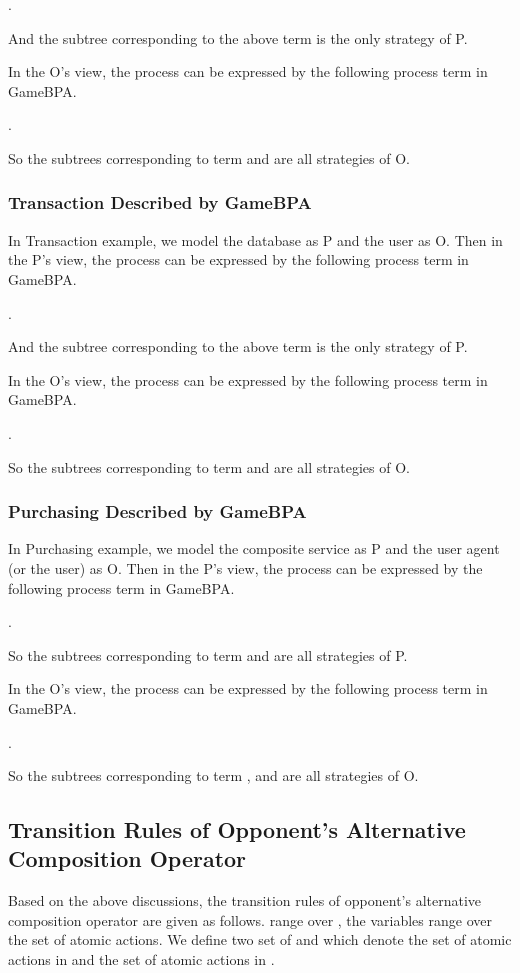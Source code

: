 \documentclass{fac}
\begin{document}
.

And the subtree corresponding to the above term is the only strategy of P.

In the O's view, the process can be expressed by the following process term in GameBPA.

.

So the subtrees corresponding to term  and  are all strategies of O.

\subsubsection{Transaction Described by GameBPA}

In Transaction example, we model the database as P and the user as O. Then in the P's view, the process can be expressed by the following process term in GameBPA.

.

And the subtree corresponding to the above term is the only strategy of P.

In the O's view, the process can be expressed by the following process term in GameBPA.

.

So the subtrees corresponding to term  and  are all strategies of O.

\subsubsection{Purchasing Described by GameBPA}

In Purchasing example, we model the composite service as P and the user agent (or the user) as O. Then in the P's view, the process can be expressed by the following process term in GameBPA.

.

So the subtrees corresponding to term  and  are all strategies of P.

In the O's view, the process can be expressed by the following process term in GameBPA.

.

So the subtrees corresponding to term ,  and  are all strategies of O.

\subsection{Transition Rules of Opponent's Alternative Composition Operator}

Based on the above discussions, the transition rules of opponent's alternative composition operator  are given as follows.  range over , the variables  range over the set  of atomic actions. We define two set of  and  which denote the set of atomic actions in  and the set of atomic actions in .
\end{document}
